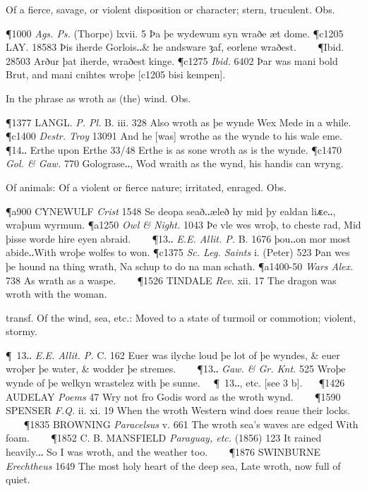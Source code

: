 \begin{description}[wide, labelwidth=!, labelindent=0pt]
\begin{myenumerate}
 Of a fierce, savage, or violent disposition or character; stern, truculent. Obs.

\P 1000  \textit{Ags. Ps.} (Thorpe) lxvii. 5 Þa þe wydewum syn wraðe æt dome.
\P c1205 LAY.  18583 Þis iherde Gorlois‥\& he andsware ȝaf, eorlene wraðest.    
\P Ibid. 28503 Arður þat iherde, wraðest kinge.
\P c1275  \textit{Ibid.} 6402 Þar was mani bold Brut, and mani cnihtes wroþe [c1205 bisi kempen].

 In the phrase as wroth as (the) wind. Obs.

\P 1377 LANGL.  \textit{P. Pl.} B. iii. 328 Also wroth as þe wynde Wex Mede in a while.
\P c1400  \textit{Destr. Troy} 13091 And he [was] wrothe as the wynde to his wale eme.    
\P 14‥ Erthe upon Erthe 33/48 Erthe is as sone wroth as is the wynde.
\P c1470 \textit{Gol. \& Gaw.}  770 Golograse‥, Wod wraith as the wynd, his handis can wryng.

 Of animals: Of a violent or fierce nature; irritated, enraged. Obs.

\P a900 CYNEWULF \textit{Crist} 1548 Se deopa  seað‥æleð hy mid þy ealdan liᴁe‥, wraþum wyrmum.
\P a1250 \textit{Owl \& Night.} 1043 Þe  vle wes wroþ, to cheste rad, Mid þisse worde hire eyen abraid.    
\P 13‥ \textit{E.E. Allit. P.} B. 1676 þou‥on  mor most abide‥With wroþe wolfes to won.
\P c1375  \textit{Sc. Leg. Saints} i. (Peter) 523 Þan wes þe hound na thing wrath, Na schup to do na man schath.
\P a1400-50  \textit{Wars Alex.} 738 As wrath as a waspe.    
\P 1526 TINDALE  \textit{Rev.} xii. 17 The dragon was wroth with the woman.

 transf. Of the wind, sea, etc.: Moved to a state of turmoil or commotion; violent, stormy.

\P 13‥ \textit{E.E. Allit. P.} C. 162 Euer was ilyche loud þe lot of þe wyndes, \& euer wroþer þe water, \& wodder þe stremes.    
\P 13‥ \textit{Gaw. \& Gr. Knt.} 525 Wroþe wynde of þe welkyn wrastelez with þe sunne.  
\P 13‥, etc. [see 3 b].   
\P 1426 AUDELAY  \textit{Poems} 47 Wry not fro Godis word as the wroth wynd.    
\P 1590 SPENSER  \textit{F.Q.} ii. xi. 19 When the wroth Western wind does reaue their locks.    
\P 1835 BROWNING  \textit{Paracelsus} v. 661 The wroth sea's waves are edged With foam.    
\P 1852 C. B. MANSFIELD  \textit{Paraguay, etc.} (1856) 123 It rained heavily.‥ So I was wroth, and the weather too.    
\P 1876 SWINBURNE \textit{Erechtheus} 1649 The  most holy heart of the deep sea, Late wroth, now full of quiet.


\end{myenumerate}
\end{description}
